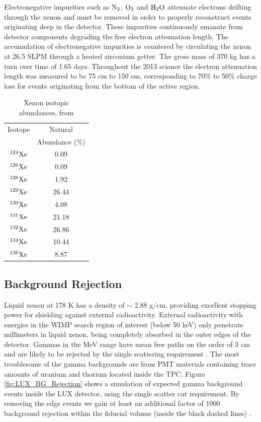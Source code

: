 Electronegative impurities such as $\rm N_2$, $\rm O_2$ and $\rm H_2O$ attenuate electrons drifting through the xenon and must be removed in order to properly reconstruct events originating deep in the detector. These impurities continuously emanate from detector components degrading the free electron attenuation length. The accumulation of electronegative impurities is countered by circulating the xenon at 26.5 SLPM through a heated zirconium getter. The gross mass of 370 kg has a turn over time of 1.65 days. Throughout the 2013 science the electron attenuation length was measured to be 75 cm to 150 cm, corresponding to 70\% to 50\% charge loss for events originating from the bottom of the active region.

\renewcommand{\baselinestretch}{1}
\small\normalsize
\begin{table}[h!]
\begin{center}
\begin{tabular}{|c|c|}
\hline
Isotope & Natural \\
		& Abundance (\%) \\ \hline
$\rm^{124}Xe$ & 0.09 \\ \hline
$\rm^{126}Xe$ & 0.09 \\ \hline
$\rm^{128}Xe$ & 1.92 \\ \hline
$\rm^{129}Xe$ & 26.44 \\ \hline
$\rm^{130}Xe$ & 4.08 \\ \hline
$\rm^{131}Xe$ & 21.18 \\ \hline
$\rm^{132}Xe$ & 26.86 \\ \hline
$\rm^{134}Xe$ & 10.44 \\ \hline
$\rm^{136}Xe$ & 8.87 \\ \hline
\end{tabular}
\caption{Xenon isotopic abundances, from \cite{Xe_Isotopes}}
\label{table:Xe_Isotopes}
\end{center}
\end{table}
\renewcommand{\baselinestretch}{2}
\small\normalsize


\subsection{Background Rejection}
\label{sec:BG_Rejection}
Liquid xenon at 178 K has a density of $\sim$ 2.88 g/cm, providing excellent stopping power for shielding against external radioactivity. External radioactivity with energies in the WIMP search region of interest (below 50 keV) only penetrate millimeters in liquid xenon, being completely absorbed in the outer edges of the detector. Gammas in the MeV range have mean free paths on the order of 3 cm and are likely to be rejected by the single scattering requirement . The most troublesome of the gamma backgrounds are from PMT materials containing trace amounts of uranium and thorium located inside the TPC. Figure \ref{fig:LUX_BG_Rejection} shows a simulation of expected gamma background events inside the LUX detector, using the single scatter cut requirement. By removing the edge events we gain at least an additional factor of 1000 background rejection within the fiducial volume (inside the black dashed lines) \cite{LUX_BG}.

